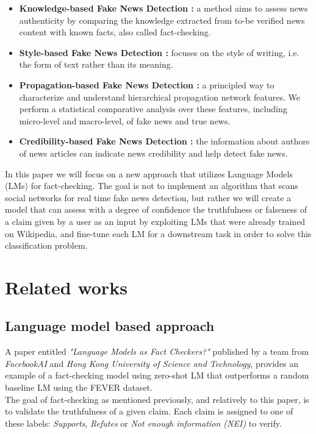 \documentclass[conference]{IEEEtran}
\begin{document}
\begin{itemize}
\item \textbf{Knowledge-based Fake News Detection \cite{chernyavskiy2021whatthewikifact}:} a method aims to assess news authenticity by comparing the knowledge extracted from to-be verified news content with known facts, also called fact-checking.
\item \textbf{Style-based Fake News Detection \cite{przybyla2020capturing}:} focuses on the style of writing, i.e. the form of text rather than its meaning.
\item \textbf{Propagation-based Fake News Detection \cite{shu2020hierarchical}:} a principled way to characterize and understand hierarchical propagation network features. We perform a statistical comparative analysis over these features, including micro-level and macro-level, of fake news and true news.
\item \textbf{Credibility-based Fake News Detection \cite{sitaula2020credibility}:} the information about authors of news articles can indicate news credibility and help detect fake news.
\end{itemize}

In this paper we will focus on a new approach that utilizes Language Models (LMs) for fact-checking. The goal is not to implement an algorithm that scans social networks for real time fake news detection, but rather we will create a model that can assess with a degree of confidence the truthfulness or falseness of a claim given by a user as an input by exploiting LMs that were already trained on Wikipedia, and fine-tune each LM for a downstream task in order to solve this classification problem.

\section{Related works}
\subsection{Language model based approach \cite{lee2020language} \cite{petroni2019language}}
A paper entitled \textit{"Language Models as Fact Checkers?"} published by a team from \textit{FacebookAI} and \textit{Hong Kong University of Science and Technology}, provides an example of a fact-checking model using zero-shot LM that outperforms a random baseline LM using the FEVER dataset\cite{thorne2018fever}.\\

The goal of fact-checking as mentioned previously, and relatively to this paper, is to validate the truthfulness of a given claim. Each claim is assigned to one of these labels: \textit{Supports}, \textit{Refutes} or \textit{Not enough information (NEI)} to verify.\\
\end{document}
